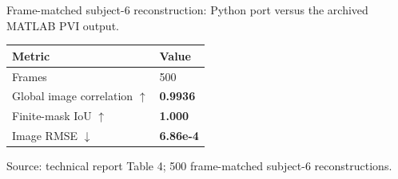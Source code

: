 \documentclass[border=6pt]{standalone}
\begin{document}
\begin{minipage}{13.8cm}

  \vspace{0.25em}
  {\small\color{baselineGray}Frame-matched subject-6 reconstruction:
  Python port versus the archived MATLAB PVI output.}

  \vspace{0.5em}
  \renewcommand{\arraystretch}{1.45}
  \setlength{\tabcolsep}{8pt}
  \begin{tabular}{@{}L{8.7cm}C{3.8cm}@{}}
    \toprule
    \textbf{Metric} & \textbf{Value} \\
    \midrule
    Frames & 500 \\
    Global image correlation $\uparrow$ & \textbf{0.9936} \\
    Finite-mask IoU $\uparrow$ & \textbf{1.000} \\
    Image RMSE $\downarrow$ & \textbf{6.86e-4} \\
    \bottomrule
  \end{tabular}


  {\scriptsize\color{baselineGray}Source: technical report Table 4; 500
  frame-matched subject-6 reconstructions.}
\end{minipage}
\end{document}
